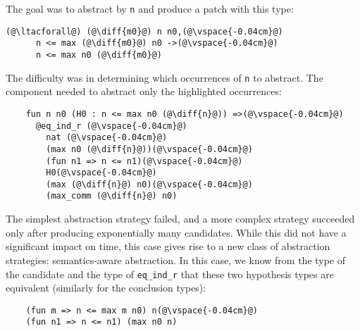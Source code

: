The goal was to abstract by \lstinline{n} and produce a patch with this type:

\begin{lstlisting}[language=coq]
    (@\ltacforall@) (@\diff{m0}@) n n0,(@\vspace{-0.04cm}@)
      n <= max (@\diff{m0}@) n0 ->(@\vspace{-0.04cm}@)
      n <= max n0 (@\diff{m0}@)
\end{lstlisting}


The difficulty was in determining which occurrences of \lstinline{n} to abstract.
The component needed to abstract only the highlighted occurrences:

\begin{lstlisting}
    fun n n0 (H0 : n <= max n0 (@\diff{n}@)) =>(@\vspace{-0.04cm}@)
      @eq_ind_r (@\vspace{-0.04cm}@)
        nat (@\vspace{-0.04cm}@)
        (max n0 (@\diff{n}@))(@\vspace{-0.04cm}@)
        (fun n1 => n <= n1)(@\vspace{-0.04cm}@)
        H0(@\vspace{-0.04cm}@)
        (max (@\diff{n}@) n0)(@\vspace{-0.04cm}@)
        (max_comm (@\diff{n}@) n0)
\end{lstlisting}

The simplest abstraction strategy failed, and a more
complex strategy
succeeded only after producing exponentially many candidates.
While this did not have a significant impact on time,
this case gives rise to a new class of abstraction strategies:
semantics-aware abstraction.
In this case, we know from the type of the candidate
and the type of \lstinline{eq_ind_r} that these two hypothesis types 
are equivalent (similarly for the conclusion types):

\begin{lstlisting}
    (fun m => n <= max m n0) n(@\vspace{-0.04cm}@)
    (fun n1 => n <= n1) (max n0 n)
\end{lstlisting}

